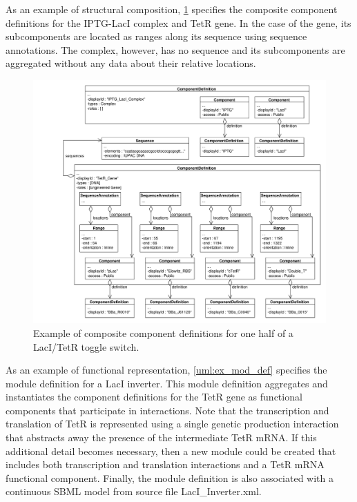 As an example of structural composition, \ref{uml:ex_comp_def_compo} specifies the composite component definitions for the IPTG-LacI complex and TetR gene. In the case of the gene, its subcomponents are located as ranges along its sequence using sequence annotations. The complex, however, has no sequence and its subcomponents are aggregated without any data about their relative locations.


\begin{figure}[ht]
\begin{center}
\includegraphics[width=\textwidth]{example_uml/toggle_2}
\caption[]{Example of composite component definitions for one half of a LacI/TetR toggle switch.}
\label{uml:ex_comp_def_compo}
\end{center}
\end{figure}

As an example of functional representation, \ref{uml:ex_mod_def} specifies the module definition for a LacI inverter. This module definition aggregates and instantiates the component definitions for the TetR gene as functional components that participate in interactions. Note that the transcription and translation of TetR is represented using a single genetic production interaction that abstracts away the presence of the intermediate TetR mRNA. If this additional detail becomes necessary, then a new module could be created that includes both transcription and translation interactions and a TetR mRNA functional component. Finally, the module definition is also associated with a continuous SBML model from source file LacI\_Inverter.xml.

